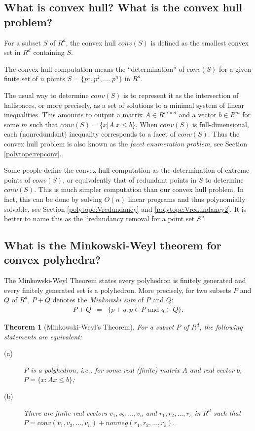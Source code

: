 \documentclass[a4paper,12pt]{article}
\newtheorem{theorem}{Theorem}
\begin{document}
\subsection{What is convex hull?  What is the convex hull problem?}
\label{polytope:convhullcomp}

For a subset $S$ of $R^d$, the convex hull $conv(S)$ is defined
as the smallest convex set in $R^d$ containing $S$.

The convex hull computation means the ``determination''
of $conv(S)$ for a given finite set of $n$ points 
$S =  \{p^1, p^2, \ldots, p^n\}$
in $R^d$.  

The usual way to determine $conv(S)$ is to
represent it as the intersection of halfspaces, or more precisely,
as a set of solutions to a minimal system of linear inequalities.
This amounts to output a matrix $A \in R^{m \times d}$ and
a vector $b\in R^m$ for some $m$ such that 
$conv(S) =\{ x | A \; x \le b \}$.
When $conv(S)$ is full-dimensional, 
each (nonredundant) inequality corresponds to
a facet of $conv(S)$.  Thus the convex hull problem is
also known as the {\em facet enumeration problem}, see 
Section \ref{polytope:repconv}.

Some people define the convex hull computation as the determination
of extreme points of $conv(S)$, or equivalently that of
redundant points in $S$ to determine $conv(S)$.  This is much simpler
computation than our convex hull problem.  In fact, this can be done
by solving $O(n)$ linear programs and thus polynomially solvable, 
see Section \ref{polytope:Vredundancy}
and \ref{polytope:Vredundancy2}.
It is better to name this as the ``redundancy removal for a point set $S$''.

\subsection{What is the Minkowski-Weyl theorem for convex polyhedra?
 } 
\label{polytope:MWtheorem}

The Minkowski-Weyl Theorem states every polyhedron is
finitely generated and every finitely generated set is a
polyhedron.  More precisely,
for two subsets $P$ and $Q$ of $R^d$, $P+Q$ denotes the
{\em Minkowski sum} of $P$ and $Q$:
\begin{eqnarray*}
    P + Q & = & 
    \{ p +q: p \in P \mbox{ and } q \in Q  \}.
\end{eqnarray*}

\begin{theorem} [Minkowski-Weyl's Theorem] \label{thm:Minkowski-Weyl1}
For a subset $P$ of $R^d$, the  following statements are equivalent:
\begin{description}
\item[(a)] P is a polyhedron, i.e., for some real (finite) matrix $A$ and real vector $b$,
$ P=\{ x :  A  x  \le  b \}$;

\item[(b)] There are finite real vectors $v_1, v_2, \ldots, v_n$ and 
$r_1, r_2, \ldots, r_s$ in $R^d$
such that\\
$P = conv(v_1, v_2, \ldots, v_n) + nonneg(r_1, r_2, \ldots, r_s)$. 
\end{description}
\end{theorem}
\end{document}
